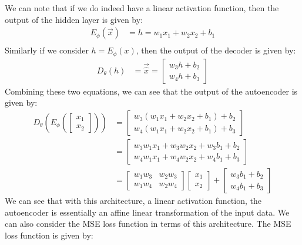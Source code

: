 \documentclass[answers,12pt,addpoints]{exam}
\begin{document}
We can note that if we do indeed have a linear activation function, then the output of the hidden layer is given by: 
\begin{align*}
    E_\phi(\vec{x}) &= h = w_1 x_1 + w_2 x_2 + b_1 \\
\end{align*}
Similarly if we consider $h = E_\phi(x)$, then the output of the decoder is given by:
\begin{align*}
    D_\theta(h) &= \vec{\hat{x}} = \begin{bmatrix}
        w_3h + b_2 \\
        w_4h + b_3
    \end{bmatrix}
\end{align*}
Combining these two equations, we can see that the output of the autoencoder is given by:
\begin{align*}
    D_\theta(E_\phi(\begin{bmatrix}
        x_1 \\
        x_2
    \end{bmatrix})) &= \begin{bmatrix}
        w_3(w_1 x_1 + w_2 x_2 + b_1) + b_2 \\
        w_4(w_1 x_1 + w_2 x_2 + b_1) + b_3
    \end{bmatrix} \\
    &= \begin{bmatrix}
        w_3w_1 x_1 + w_3w_2 x_2 + w_3b_1 + b_2 \\
        w_4w_1 x_1 + w_4w_2 x_2 + w_4b_1 + b_3
    \end{bmatrix} \\
    &= \begin{bmatrix}
        w_1 w_3 & w_2 w_3\\
        w_1 w_4 & w_2 w_4
    \end{bmatrix} \begin{bmatrix}
        x_1 \\
        x_2
    \end{bmatrix} + \begin{bmatrix}
        w_3b_1 + b_2 \\
        w_4b_1 + b_3
    \end{bmatrix}
\end{align*}
We can see that with this architecture, a linear activation function, the autoencoder is essentially an affine linear transformation of the input data. 
We can also consider the MSE loss function in terms of this architecture. The MSE loss function is given by:
\end{document}
